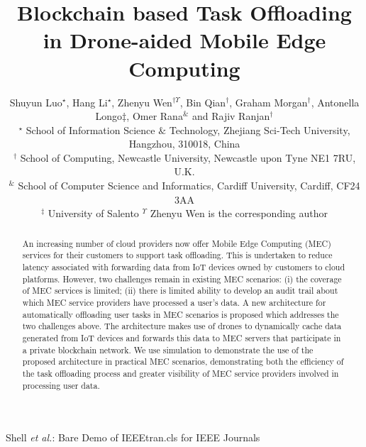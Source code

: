 \documentclass[10pt,journal,compsoc]{IEEEtran}
\begin{document}
\title{Blockchain based Task Offloading in Drone-aided Mobile Edge Computing}

\author{Shuyun Luo$^{\star}$, Hang Li$^{\star}$, Zhenyu Wen$^{\dagger \Upsilon}$, Bin Qian$^{\dagger}$, Graham Morgan$^{\dagger}$, Antonella Longo$\ddagger$, Omer Rana$^\&$ and Rajiv Ranjan$^{\dagger}$
     
\small{$^\star$ School of Information Science $\&$ Technology, Zhejiang
Sci-Tech University, Hangzhou, 310018, China}\\
\small{ $^\dagger$ School of Computing, Newcastle University, Newcastle upon Tyne NE1 7RU, U.K.} \\
\small{ $^\&$ School of Computer Science and Informatics, Cardiff University, Cardiff, CF24 3AA} \\
\small{ $^\ddagger$ University of Salento}
\small{ $^\Upsilon$ Zhenyu Wen is the corresponding author}
}


%
{Shell \MakeLowercase{\textit{et al.}}: Bare Demo of IEEEtran.cls for IEEE Journals}


\maketitle


\begin{abstract}
An increasing number of cloud providers now offer Mobile Edge Computing (MEC) services for their customers to support task offloading. This is undertaken to reduce latency associated with forwarding data from IoT devices owned by customers to cloud platforms. However, two challenges remain in existing MEC scenarios: (i) the coverage of MEC services is limited; (ii) there is limited ability to develop an audit trail about which MEC service providers have processed a user's data. A new architecture for automatically offloading user tasks in MEC scenarios is proposed which addresses the two challenges above. The architecture makes use of drones to dynamically cache data generated from IoT devices and forwards this data to MEC servers that participate in a private blockchain network. We use simulation to demonstrate the use of the proposed architecture in practical MEC scenarios, demonstrating both the efficiency of the task offloading process and greater visibility of MEC service providers involved in processing user data.    

\end{abstract}
\end{document}
